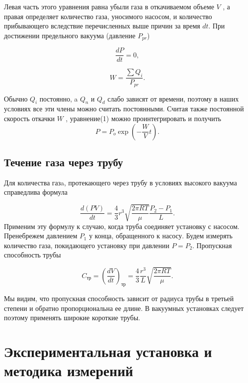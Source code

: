 \documentclass[a4paper,12pt]{article}
\begin{document}
    Левая часть этого уравнения равна убыли газа в откачиваемом объеме $V$ , а правая определяет количество газа, уносимого насосом, и количество прибывающего вследствие перечисленных выше причин
    за время $dt$. При достижении предельного вакуума (давление $P_{pr}$)

    \begin{equation}
	    \frac{dP}{dt}=0,
    \end{equation}

    \begin{equation}
	    W=\frac{\sum Q_i}{P_{pr}}.
    \end{equation}

    Обычно $Q_i$ постоянно, a $Q_n$ и $Q_d$ слабо зависят от времени, поэтому в наших условиях все эти члены можно считать постоянными. Считая также постоянной скорость откачки $W$ , уравнение(1) можно проинтегрировать и получить
    \begin{equation}
    \label{davlenie}
	    P = P_o \exp{(-\frac{W}{V} t)}.
    \end{equation}



    \subsection*{Течение газа через трубу}
	Для количества газa, протекающего через трубу в условиях высокого вакуума справедлива формула

    \begin{equation}
	    \frac{d(PV)}{dt}=\frac{4}{3}r^3 \sqrt{\frac{2\pi RT}{\mu}} \frac{P_2-P_1}{L}.
    \end{equation}
    Применим эту формулу к случаю, когда труба соединяет установку с насосом.
    Пренебрежем давлением $P_1$ у конца, обращенного к насосу. Будем измерять количество газа, покидающего установку при давлении $P = P_2$. Пропускная способность трубы

    \begin{equation}
	    C_{тр}=\left(\frac{dV}{dt}\right)_{тр}=\frac{4}{3}\frac{r^3}{L}\sqrt{\frac{2\pi RT}{\mu}}.
    \end{equation}

	Мы видим, что пропускная способность зависит от радиуса трубы в третьей степени и обратно пропорциональна ее длине. В вакуумных установках следует поэтому применять широкие короткие  трубы.
	
    \section{Экспериментальная установка и методика измерений}
\end{document}
